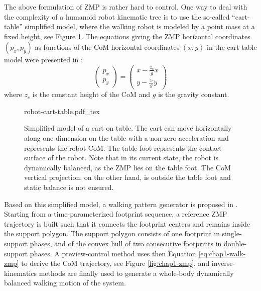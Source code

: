 The above formulation of ZMP is rather hard to control. One way to
deal with the complexity of a humanoid robot kinematic tree is to use
the so-called ``cart-table'' simplified model, where the walking robot
is modeled by a point mass at a fixed height, see Figure
\ref{fig:chap1-robot-cart-table}. The equations giving the ZMP
horizontal coordinates $(p_x,p_y)$ as functions of the CoM horizontal
coordinates $(x,y)$ in the cart-table model were presented in
\cite{kaji03}:
\begin{equation}
\label{eq:chap1-walk-zmp}
\left(
\begin{array}{c}
p_x\\ p_y
\end{array}
\right) = \displaystyle \left(
\begin{array}{c}
x - \frac{z_c}{g} \ddot{x}\\ y - \frac{z_c}{g} \ddot{y}
\end{array}
\right)
\end{equation}
where $z_c$ is the constant height of the CoM and $g$ is the gravity
constant.

\begin{figure}
  \centering
      {\def\svgwidth{0.5\linewidth}
        
                   {robot-cart-table.pdf_tex}}
      \caption{Simplified model of a cart on table. The cart can move
        horizontally along one dimension on the table with a non-zero
        acceleration and represents the robot CoM. The table foot
        represents the contact surface of the robot. Note that in its
        current state, the robot is dynamically balanced, as the ZMP
        lies on the table foot. The CoM vertical projection, on the
        other hand, is outside the table foot and static balance is
        not ensured.}
      \label{fig:chap1-robot-cart-table}
\end{figure}

Based on this simplified model, a walking pattern generator is
proposed in \cite{kaji03}. Starting from a time-parameterized
footprint sequence, a reference ZMP trajectory is built such that it
connects the footprint centers and remains inside the support
polygon. The support polygon consists of one footprint in
single-support phases, and of the convex hull of two consecutive
footprints in double-support phases. A preview-control method uses
then Equation \ref{eq:chap1-walk-zmp} to derive the CoM trajectory,
see Figure \ref{fig:chap1-zmp}, and inverse-kinematics methods are
finally used to generate a whole-body dynamically balanced walking
motion of the system.

